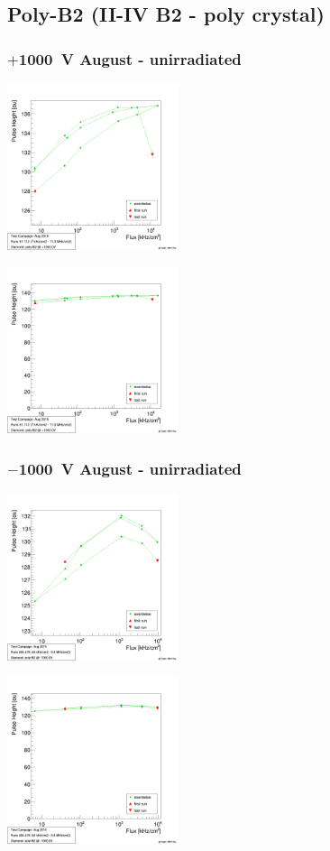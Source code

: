 \documentclass[9pt]{beamer}
\begin{document}
\subsection{Poly-B2 (II-IV B2 - poly crystal)}
\begin{frame}
	\frametitle{$+$\SI{1000}{V} August - unirradiated}
	\begin{minipage}{5.5cm}
		\centering
		\includegraphics[width=5cm]{PH02}
	\end{minipage}
	\hspace*{2pt}
	\begin{minipage}{5.5cm}
		\centering
		\includegraphics[width=5cm]{PHZ02}
	\end{minipage}
\end{frame}
\begin{frame}
	\frametitle{$-$\SI{1000}{V} August - unirradiated}
	\begin{minipage}{5.5cm}
		\centering
		\includegraphics[width=5cm]{PH13}
	\end{minipage}
	\hspace*{2pt}
	\begin{minipage}{5.5cm}
		\centering
		\includegraphics[width=5cm]{PHZ13}
	\end{minipage}
\end{frame}
\end{document}
